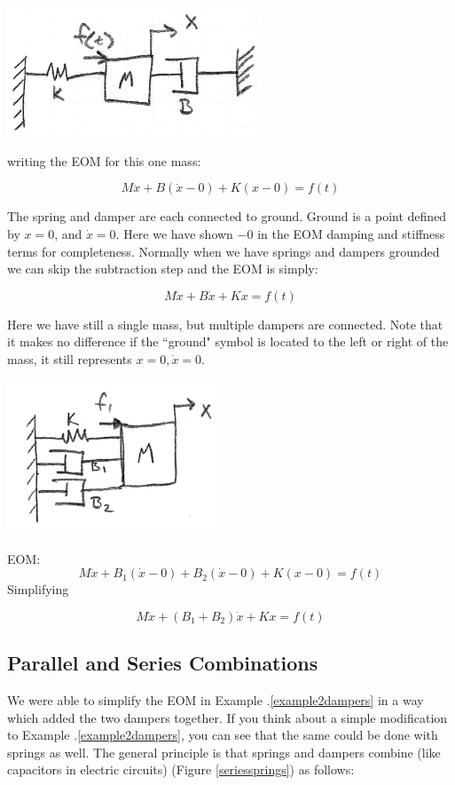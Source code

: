 \begin{ExampleSmall}

\includegraphics[width=3.0in]{figs02/00721a.png}

writing the EOM for this one mass:

\[
M\ddot{x} + B(\dot{x} - 0) + K(x-0) = f(t)
\]

The spring and damper are each connected to ground.  Ground is a point defined by $x=0$, and $\dot{x}=0$.   Here we have shown $-0$ in the EOM damping and stiffness terms for completeness.  
Normally when we have springs and dampers grounded we can skip the subtraction step and the EOM is simply:

\[
M\ddot{x} + B\dot{x} + Kx = f(t)
\]

\end{ExampleSmall}





\begin{ExampleSmall}\label{example2dampers}
Here we have still a single mass, but multiple dampers are connected.   Note that it makes no difference if the ``ground" symbol is located to the left or right of the mass, it still represents $x=0, \dot{x}=0$.



\includegraphics[width=2.5in]{figs02/00722a.png}


EOM:
\[
M\ddot{x} + B_1(\dot{x}-0)+B_2(\dot{x}-0)+K(x-0) = f(t)
\]
Simplifying

\[
M\ddot{x} + (B_1+B_2)\dot{x}+Kx = f(t)
\]
\end{ExampleSmall}


\subsection{Parallel and Series Combinations}
We were able to simplify the EOM in Example \thechapter.\ref{example2dampers} in a way which added the two dampers together.   If you think about a simple modification to Example \thechapter.\ref{example2dampers}, you can see that the same could be done with springs as well.
The general principle is that springs and dampers combine (like capacitors in electric circuits) (Figure \ref{seriessprings}) as follows:

